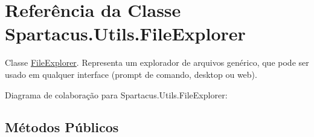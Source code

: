 \hypertarget{classSpartacus_1_1Utils_1_1FileExplorer}{\section{Referência da Classe Spartacus.\+Utils.\+File\+Explorer}
\label{classSpartacus_1_1Utils_1_1FileExplorer}
}


Classe \hyperlink{classSpartacus_1_1Utils_1_1FileExplorer}{File\+Explorer}. Representa um explorador de arquivos genérico, que pode ser usado em qualquer interface (prompt de comando, desktop ou web).  




Diagrama de colaboração para Spartacus.\+Utils.\+File\+Explorer\+:
\subsection*{Métodos Públicos}
